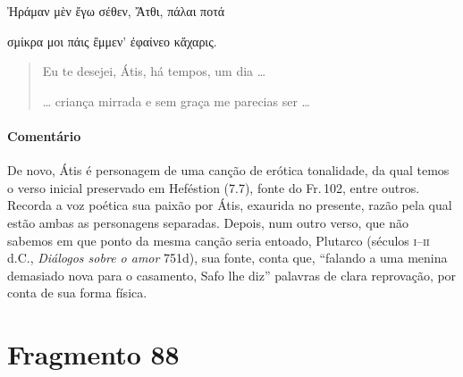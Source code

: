 \begin{gkverse}
Ἠράμαν μὲν ἔγω σέθεν, Ἄτθι, πάλαι ποτά

\ast\quad\ast\quad\ast

σμίκρα μοι πάις ἔμμεν’ ἐφαίνεο κἄχαρις.
\end{gkverse}

\begin{verse}
Eu te desejei, Átis, há tempos, um dia \ldots{}

\ast\quad\ast\quad\ast

\ldots{} criança mirrada e sem graça me parecias ser \ldots{}
\end{verse}

{\paragraph{Comentário} De novo, Átis é personagem de uma canção de erótica tonalidade, da qual temos o verso inicial preservado em Heféstion (7.7), fonte do Fr.\,102, entre outros. Recorda a voz poética sua paixão por Átis, exaurida no presente, razão pela qual estão ambas as personagens separadas. Depois, num outro verso, que não sabemos em que ponto da mesma canção seria entoado, Plutarco (séculos \textsc{i}--\textsc{ii} d.C., \textit{Diálogos sobre o amor} 751d),
sua fonte, conta que, “falando a uma menina demasiado nova para o
casamento, Safo lhe diz” palavras de clara reprovação, por conta de sua forma
física. }



\pagebreak
\section{Fragmento 88}


